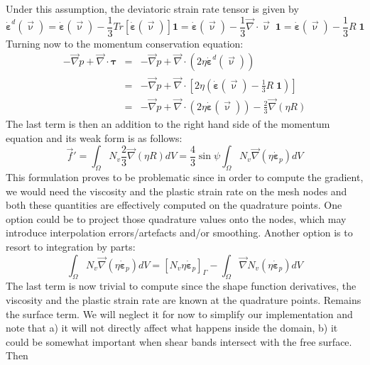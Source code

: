 Under this assumption, the deviatoric strain rate tensor is given by
\begin{equation}
\dot{\bm \varepsilon}^d(\vec\upnu)
= \dot{\bm \varepsilon}(\vec\upnu)- \frac{1}{3} Tr[\dot{\bm \varepsilon}(\vec\upnu)] {\bm 1}
= \dot{\bm \varepsilon}(\vec\upnu)- \frac{1}{3} \vec\nabla\cdot\vec\upnu \; {\bm 1}
= \dot{\bm \varepsilon}(\vec\upnu)- \frac{1}{3} R \; {\bm 1}
\end{equation}
Turning now to the momentum conservation equation:
\begin{eqnarray}
-\vec\nabla p + \vec\nabla \cdot {\bm \tau} 
&=& -\vec\nabla p + \vec\nabla \cdot (2 \eta \dot{\bm \varepsilon}^d(\vec\upnu)) \nonumber \\
&=& -\vec\nabla p + \vec\nabla \cdot \left[ 2 \eta \left(\dot{\bm \varepsilon}(\vec\upnu)- \frac{1}{3} R \; {\bm 1}\right) \right] \nonumber\\
&=& -\vec\nabla p 
+ \vec\nabla \cdot \left( 2 \eta \dot{\bm \varepsilon}(\vec\upnu)\right) -\frac{2}{3} \vec\nabla(\eta R) 
\label{chpeform}
\end{eqnarray}
The last term is then an addition to the right hand side of the momentum equation 
and its weak form is as follows:
\begin{equation}
\vec f' 
= \int_\Omega N_v \frac{2}{3} \vec\nabla(\eta R) dV
= \frac{4}{3} \sin \psi \int_\Omega N_v \vec\nabla(\eta \dot{\bm \varepsilon}_p) dV
\end{equation}
This formulation proves to be problematic since in order to compute the gradient, we would
need the viscosity and the plastic strain rate on the mesh nodes and both these quantities
are effectively computed on the quadrature points. One option could be to project those quadrature
values onto the nodes, which may introduce interpolation errors/artefacts and/or smoothing. 
Another option is to resort to integration by parts:
\begin{equation}
\int_\Omega N_v \vec\nabla(\eta \dot{\bm \varepsilon}_p) dV
= \left[ N_v \eta \dot{\bm \varepsilon}_p \right]_\Gamma 
-\int_\Omega \vec\nabla N_v (\eta \dot{\bm \varepsilon}_p) dV
\end{equation}
The last term is now trivial to compute since the shape function derivatives, the viscosity
and the plastic strain rate are known at the quadrature points. Remains the surface term. 
We will neglect it for now to simplify our implementation and note that a) it will not directly 
affect what happens inside the domain, b) it could be somewhat important when shear bands
intersect with the free surface. Then 

